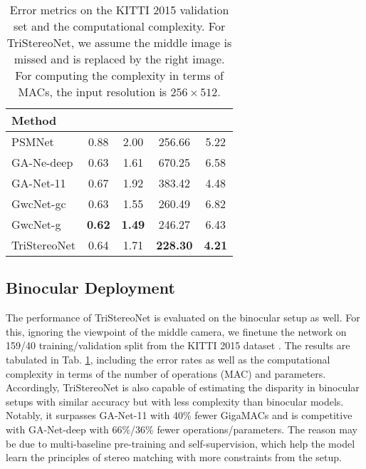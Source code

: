 \documentclass[10pt,twocolumn,letterpaper]{article}
\begin{document}
\begin{table}[tbp]
	\begin{center}
		\footnotesize
		\begin{tabular}{@{\hskip2pt}l@{\hskip1pt}|@{\hskip2pt}c@{\hskip2pt}c@{\hskip2pt}|@{\hskip2pt}c@{\hskip2pt}c@{\hskip2pt}}
			\hline				
			{Method} & \hspace{0.1cm}{EPE($px$) $\downarrow$} & \hspace{0.1cm}{D1(\%) $\downarrow$} & \hspace{0.1cm}{MACs($G$) $\downarrow$} & \hspace{0.1cm}{Params($M$) $\downarrow$} \\				
			\hline				
			PSMNet\cite{chang2018pyramid} & 0.88 & 2.00  & 256.66 & 5.22 \\
			GA-Ne-deep\cite{zhang2019ga}  & 0.63 & 1.61  & 670.25 & 6.58 \\
			GA-Net-11\cite{zhang2019ga}   & 0.67 & 1.92  & 383.42 & 4.48 \\
			GwcNet-gc\cite{guo2019group}  & 0.63 & 1.55  & 260.49 & 6.82 \\
			GwcNet-g\cite{guo2019group}   & \textbf{0.62} & \textbf{1.49}  & 246.27 & 6.43 \\ \hdashline
			TriStereoNet                  & 0.64 & 1.71 & \textbf{228.30} & \textbf{4.21} \\
			\hline				
		\end{tabular}
	\end{center}
	\vspace*{-0.3cm}
	\caption{Error metrics on the KITTI 2015 validation set and the computational complexity. For TriStereoNet, we assume the middle image is missed and is replaced by the right image. For computing the complexity in terms of MACs, the input resolution is $256 \times 512$.}
	\label{tab:kitti2015}
\end{table} \subsection{Binocular Deployment}
The performance of TriStereoNet is evaluated on the binocular setup as well. For this, ignoring the viewpoint of the middle camera, we finetune the network on 159/40 training/validation split from the KITTI 2015 dataset \cite{menze2015object}. The results are tabulated in Tab. \ref{tab:kitti2015}, including the error rates as well as the computational complexity in terms of the number of operations (MAC) and parameters. Accordingly, TriStereoNet is also capable of estimating the disparity in binocular setups with similar accuracy but with less complexity than binocular models. Notably, it surpasses GA-Net-11 with 40\% fewer GigaMACs and is competitive with GA-Net-deep with 66\%/36\% fewer operations/parameters. The reason may be due to multi-baseline pre-training and self-supervision, which help the model learn the principles of stereo matching with more constraints from the setup.
\end{document}
